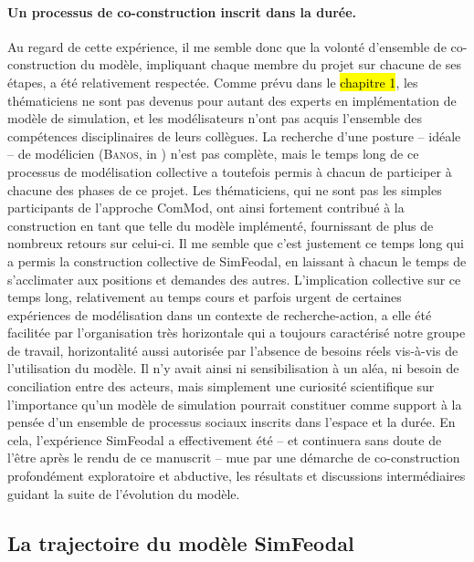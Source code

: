 \paragraph{Un processus de co-construction inscrit dans la durée.}
Au regard de cette expérience, il me semble donc que la volonté d'ensemble de co-construction du modèle, impliquant chaque membre du projet sur chacune de ses étapes, a été relativement respectée.
Comme prévu dans le \hl{chapitre 1}, les \og thématiciens\fg{} ne sont pas devenus pour autant des experts en implémentation de modèle de simulation, et les \og modélisateurs\fg{} n'ont pas acquis l'ensemble des compétences disciplinaires de leurs collègues.
La recherche d'une posture -- idéale -- de \og modélicien\fg{} (\textsc{Banos}, in \cite[484]{ouriachi_lelaboration_2017}) n'est pas complète, mais le temps long de ce processus de modélisation collective a toutefois permis à chacun de participer à chacune des phases de ce projet.
Les thématiciens, qui ne sont pas les simples \og participants\fg{} de l'approche ComMod, ont ainsi fortement contribué à la construction en tant que telle du modèle implémenté, fournissant de plus de nombreux retours sur celui-ci.
Il me semble que c'est justement ce temps long qui a permis la construction collective de SimFeodal, en laissant à chacun le temps de s'acclimater aux positions et demandes des autres.
L'implication collective sur ce temps long, relativement au temps cours et parfois urgent de certaines expériences de modélisation dans un contexte de recherche-action, a elle été facilitée par l'organisation très horizontale qui a toujours caractérisé notre groupe de travail, horizontalité aussi autorisée par l'absence de besoins réels vis-à-vis de l'utilisation du modèle.
Il n'y avait ainsi ni sensibilisation à un aléa, ni besoin de conciliation entre des acteurs, mais simplement une curiosité scientifique sur l'importance qu'un modèle de simulation pourrait constituer comme support à la pensée d'un ensemble de processus sociaux inscrits dans l'espace et la durée.
En cela, l'expérience SimFeodal a effectivement été -- et continuera sans doute de l'être après le rendu de ce manuscrit -- mue par une démarche de co-construction profondément exploratoire et abductive, les résultats et discussions intermédiaires guidant la suite de l'évolution du modèle.

\subsection{La trajectoire du modèle SimFeodal}


